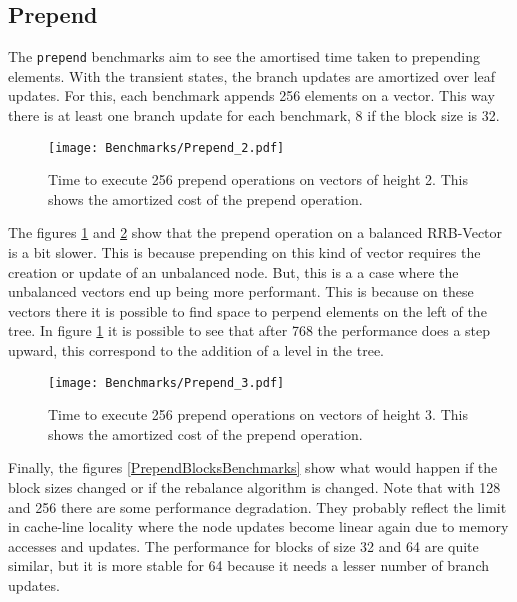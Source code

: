 \FloatBarrier

\subsection{Prepend}
The \texttt{prepend} benchmarks aim to see the amortised time taken to prepending elements. With the transient states, the branch updates are amortized over leaf updates. For this, each benchmark appends 256 elements on a vector. This way there is at least one branch update for each benchmark, 8 if the block size is 32.


\begin{figure}[h!]
  \centering
  \texttt{[image: Benchmarks/Prepend\_2.pdf]}
  \caption{Time to execute 256 prepend operations on vectors of height 2. This shows the amortized cost of the prepend operation.}
  \label{Prepend2Benchmarks}
\end{figure}

The figures \ref{Prepend2Benchmarks} and \ref{Prepend3Benchmarks} show that the prepend operation on a balanced RRB-Vector is a bit slower. This is because prepending on this kind of vector requires the creation or update of an unbalanced node. But, this is a a case where the unbalanced vectors end up being more performant. This is because on these vectors there it is possible to find space to perpend elements on the left of the tree. In figure \ref{Prepend2Benchmarks} it is possible to see that after 768 the performance does a step upward, this correspond to the addition of a level in the tree.

\begin{figure}[h!]
  \centering
  \texttt{[image: Benchmarks/Prepend\_3.pdf]}
  \caption{Time to execute 256 prepend operations on vectors of height 3. This shows the amortized cost of the prepend operation.}
  \label{Prepend3Benchmarks}
\end{figure}

\FloatBarrier

Finally, the figures \ref{PrependBlocksBenchmarks} show what would happen if the block sizes changed or if the rebalance algorithm is changed. Note that with 128 and 256 there are some performance degradation. They probably reflect the limit in cache-line locality where the node updates become linear again due to memory accesses and updates. The performance for blocks of size 32 and 64 are quite similar, but it is more stable for 64 because it needs a lesser number of branch updates.

